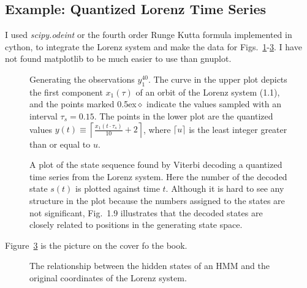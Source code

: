 \documentclass[prelim,showlabels]{book}
\newcommand{\Tsamp}{\tau_s }
\newcommand{\ceil}[1]{\lceil#1\rceil}
\newcommand{\bceil}[1]{\left\lceil#1\right\rceil}
\newcommand{\ti}[2]{{#1}{(#2)}}                  %
\newcommand{\ts}[3]{#1_{#2}^{#3}}                    %
\begin{document}
\subsection{Example: Quantized Lorenz Time Series}
\label{sec:QuantizedLorenz}

I used \emph{scipy.odeint} or the fourth order Runge Kutta formula
implemented in cython, to integrate the Lorenz system and make the
data for Figs.~\ref{fig:TSintro}-\ref{fig:Statesintro}.  I have not
found matplotlib to be much easier to use than gnuplot.
\begin{figure}[htbp]
  \caption[Generating the observations $\ts{y}{1}{40}$.]%
  {Generating the observations $\ts{y}{1}{40}$.  The curve in the
    upper plot depicts the first component $\ti{x_1}{\tau}$ of an
    orbit of the Lorenz system (1.1), and the points
    marked {\scriptsize\raise0.5ex\hbox{$\bm{\diamond}\!$}} indicate the
    values sampled with an interval $\Tsamp = 0.15$.  The points
    in the lower plot are the quantized values $\ti{y}{t} \equiv
    \bceil{\frac{\ti{x_1}{t \cdot \Tsamp}}{10} + 2}$, where
    $\ceil{u}$ is the least integer greater than or equal to $u$.  }
  \label{fig:TSintro} 
\end{figure}

 \begin{figure}[htbp]
   \caption{A plot of the state sequence found by Viterbi decoding a quantized
     time series from the Lorenz system.  Here the number of the
     decoded state $\ti{s}{t}$ is plotted against time $t$.  Although
     it is hard to see any structure in the plot because the numbers
     assigned to the states are not significant,
     Fig.~1.9 illustrates that the decoded states
     are closely related to positions in the generating state space.}
   \label{fig:STSintro}
 \end{figure}

 Figure~\ref{fig:Statesintro} is the picture on the cover fo the book.
 \begin{figure}[htb]
   \caption[Relationship between states of HMM and Lorenz system.]%
   {The relationship between the hidden states of an HMM and the
     original coordinates of the Lorenz system.}
   \label{fig:Statesintro}
 \end{figure}
\end{document}
